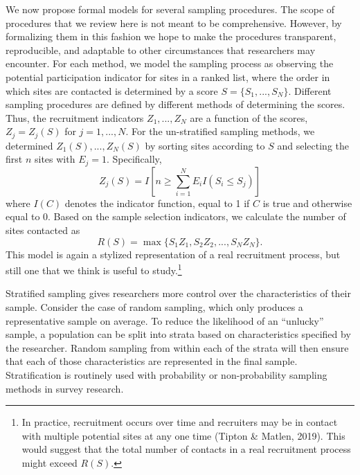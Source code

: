 \documentclass[
  english,
  man,floatsintext]{apa6}
\begin{document}
We now propose formal models for several sampling procedures. The scope of procedures that we review here is not meant to be comprehensive. However, by formalizing them in this fashion we hope to make the procedures transparent, reproducible, and adaptable to other circumstances that researchers may encounter.
For each method, we model the sampling process as observing the potential participation indicator for sites in a ranked list, where the order in which sites are contacted is determined by a score \(S = \{S_1,...,S_N\}\). Different sampling procedures are defined by different methods of determining the scores. Thus, the recruitment indicators \(Z_1,...,Z_N\) are a function of the scores, \(Z_j = Z_j(S)\) for \(j = 1,...,N\).
For the un-stratified sampling methods, we determined \(Z_1(S),...,Z_N(S)\) by sorting sites according to \(S\) and selecting the first \(n\) sites with \(E_j = 1\).
Specifically,
\begin{equation}
\label{eq:Zj}
Z_j(S) = I\left[n \geq \sum_{i=1}^N E_i I\left(S_i \leq S_j\right)\right]
\end{equation}
where \(I(C)\) denotes the indicator function, equal to 1 if \(C\) is true and otherwise equal to 0. Based on the sample selection indicators, we calculate the number of sites contacted as
\begin{equation}
\label{eq:R}
R(S) =  \max \{S_1 Z_1, S_2 Z_2, ..., S_N Z_N\}.
\end{equation}
This model is again a stylized representation of a real recruitment process, but still one that we think is useful to study.\footnote{In practice, recruitment occurs over time and recruiters may be in contact with multiple potential sites at any one time (Tipton \& Matlen, 2019). This would suggest that the total number of contacts in a real recruitment process might exceed \(R(S)\).}

Stratified sampling gives researchers more control over the characteristics of their sample. Consider the case of random sampling, which only produces a representative sample on average. To reduce the likelihood of an ``unlucky'' sample, a population can be split into strata based on characteristics specified by the researcher. Random sampling from within each of the strata will then ensure that each of those characteristics are represented in the final sample. Stratification is routinely used with probability or non-probability sampling methods in survey research.
\end{document}
